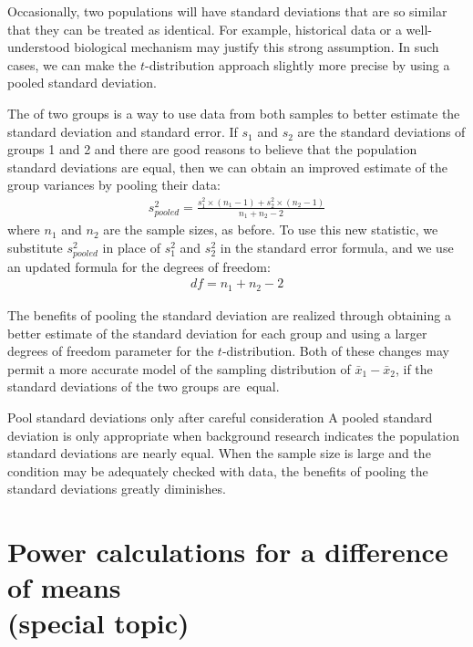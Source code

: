 {Occasionally, two populations will have standard deviations that are so similar that they can be treated as identical. For example, historical data or a well-understood biological mechanism may justify this strong assumption. In such cases, we can make the $t$-distribution approach slightly more precise by using a pooled standard deviation.

The  of two groups is a way to use data from both samples to better estimate the standard deviation and standard error. If $s_1^{}$ and $s_2^{}$ are the standard deviations of groups 1 and 2 and there are good reasons to believe that the population standard deviations are equal, then we can obtain an improved estimate of the group variances by pooling their data:
\begin{align*}
s_{pooled}^2 = \frac{s_1^2\times (n_1-1) + s_2^2\times (n_2-1)}{n_1 + n_2 - 2}
\end{align*}
where $n_1$ and $n_2$ are the sample sizes, as before. To use this new statistic, we substitute $s_{pooled}^2$ in place of $s_1^2$ and $s_2^2$ in the standard error formula, and we use an updated formula for the degrees of freedom:
\begin{align*}
df = n_1 + n_2 - 2
\end{align*}

The benefits of pooling the standard deviation are realized through obtaining a better estimate of the standard deviation for each group and using a larger degrees of freedom parameter for the $t$-distribution. Both of these changes may permit a more accurate model of the sampling distribution of $\bar{x}_1 - \bar{x}_2$, if the standard deviations of the two groups are~equal.

\begin{caution}
{Pool standard deviations only after careful consideration}
{A pooled standard deviation is only appropriate when background research indicates the population standard deviations are nearly equal. When the sample size is large and the condition may be adequately checked with data, the benefits of pooling the standard deviations greatly diminishes.}
\end{caution}
}



\section[Power calculations for a difference of means (special topic)]{Power calculations for a difference of means\\ (special topic) ~}
\label{PowerForDifferenceOfTwoMeans}

